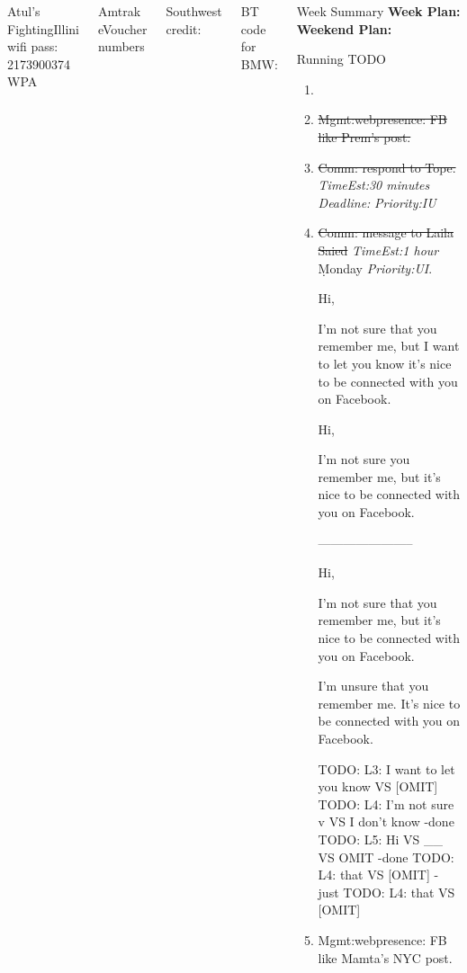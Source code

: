 \documentclass[serif, mathserif, final]{beamer}
\newcommand{\doneTask}[1]{\tiny \item \tiny \sout{#1}}
\newcommand{\te}[1]{\textit{TimeEst:}\textit{#1}}
\newcommand{\dl}[1]{\textit{Deadline:}\textit{#1}}
\newcommand{\pr}[1]{\textit{Priority:}\textit{#1}}
\begin{document}
\begin{frame}
\begin{columns}
    
    Atul’s FightingIllini  wifi pass:  2173900374 WPA  
    
    Amtrak  eVoucher numbers 
    
    Southwest credit: 
    
    BT code for BMW: 

    \begin{column}{0.50\linewidth}
      \begin{block}{Week Summary}
        {\tiny \textbf{Week Plan:} }
        {\tiny \textbf{Weekend Plan:}  }   
      \end{block} 
      \begin{block}{Running TODO} %
        \begin{enumerate} 


        \item \tiny \doneTask{ Mgmt:webpresence: FB like Prem's post. }

        \doneTask{Comm: respond to Tope.} \te{30 minutes} \dl{} \pr{IU}
         \doneTask{Comm: message to Laila Saied} \te{1 hour}
          \d{Monday} \pr{UI}. 

          Hi,
          
          I'm not sure that you remember me, but I want to let you know
          it's nice to be connected with you on Facebook.
          

          
          Hi, 
          
          I'm not sure you remember me, but it's nice to be connected with you
          on Facebook.
          

          -----------------------           
          
          Hi,
          
          I'm not sure that you remember me, but it's nice to be connected with
          you on Facebook. 

          I'm unsure that you remember me. It's nice to be connected with
          you on Facebook. 
          
          TODO: L3: I want to let you know VS [OMIT] 
          TODO: L4: I'm not sure v VS I don't know  -done
          TODO: L5: Hi VS __ VS OMIT -done          
          TODO: L4: that VS [OMIT] - just 
          TODO: L4: that VS [OMIT] 


        \item \tiny Mgmt:webpresence: FB like Mamta's NYC post.  


\end{enumerate}
\end{block}
\end{column}
\end{columns}
\end{frame}
\end{document}
